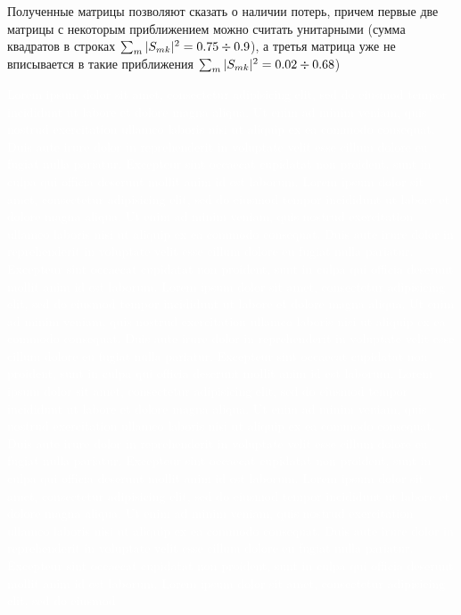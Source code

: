 \documentclass[a4paper,12pt]{article}
\begin{document}
Полученные матрицы позволяют сказать о наличии потерь, причем первые две матрицы с некоторым приближением можно считать унитарными (сумма квадратов в строках $\sum_m|S_{mk}|^2=0.75\divisionsymbol0.9$), а третья матрица уже не вписывается в такие приближения $\sum_m|S_{mk}|^2=0.02\divisionsymbol0.68$)


\textcolor{white}{
	Lorem ipsum dolor sit amet, consectetur adipisicing elit, sed do eiusmod
	tempor incididunt ut labore et dolore magna aliqua. Ut enim ad minim veniam,
	quis nostrud exercitation ullamco laboris nisi ut aliquip ex ea commodo
	consequat. Duis aute irure dolor in reprehenderit in voluptate velit esse
	cillum dolore eu fugiat nulla pariatur. Excepteur sint occaecat cupidatat non
	proident, sunt in culpa qui officia deserunt mollit anim id est laborum.
	Lorem ipsum dolor sit amet, consectetur adipisicing elit, sed do eiusmod
	tempor incididunt ut labore et dolore magna aliqua. Ut enim ad minim veniam,
	quis nostrud exercitation ullamco laboris nisi ut aliquip ex ea commodo
	consequat. Duis aute irure dolor in reprehenderit in voluptate velit esse
	cillum dolore eu fugiat nulla pariatur. Excepteur sint occaecat cupidatat non
	proident, sunt in culpa qui officia deserunt mollit anim id est laborum.	Lorem ipsum dolor sit amet, consectetur adipisicing elit, sed do eiusmod
	tempor incididunt ut labore et dolore magna aliqua. Ut enim ad minim veniam,
	quis nostrud exercitation ullamco laboris nisi ut aliquip ex ea commodo
	consequat. Duis aute irure dolor in reprehenderit in voluptate velit esse
	cillum dolore eu fugiat nulla pariatur. Excepteur sint occaecat cupidatat non
	proident, sunt in culpa qui officia deserunt mollit anim id est laborum.	Lorem ipsum dolor sit amet, consectetur adipisicing elit, sed do eiusmod
	tempor incididunt ut labore et dolore magna aliqua. Ut enim ad minim veniam,
	quis nostrud exercitation ullamco laboris nisi ut aliquip ex ea commodo
	consequat. Duis aute irure dolor in reprehenderit in voluptate velit esse
	cillum dolore eu fugiat nulla pariatur. Excepteur sint occaecat cupidatat non
	proident, sunt in culpa qui officia deserunt mollit anim id est laborum.	Lorem ipsum dolor sit amet, consectetur adipisicing elit, sed do eiusmod
	tempor incididunt ut labore et dolore magna aliqua. Ut enim ad minim veniam,
	quis nostrud exercitation ullamco laboris nisi ut aliquip ex ea commodo
	consequat. Duis aute irure dolor in reprehenderit in voluptate velit esse
	cillum dolore eu fugiat nulla pariatur. Excepteur sint occaecat cupidatat non
	proident, sunt in culpa qui officia deserunt mollit anim id est laborum.	Lorem ipsum dolor sit amet, consectetur adipisicing elit, sed do eiusmod
}
\end{document}
